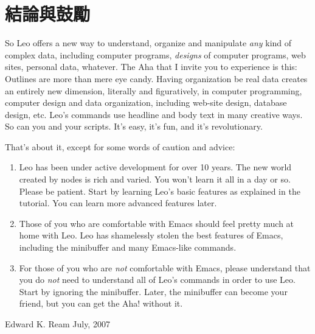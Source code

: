 \documentclass[a4paper,10pt,english]{sphinxmanual}
\begin{document}
\section{結論與鼓勵}
\label{preface:id5}
So Leo offers a new way to understand, organize and manipulate \emph{any} kind of
complex data, including computer programs, \emph{designs} of computer programs, web
sites, personal data, whatever. The Aha that I invite you to experience is this:
Outlines are more than mere eye candy. Having organization be real data creates
an entirely new dimension, literally and figuratively, in computer programming,
computer design and data organization, including web-site design, database
design, etc. Leo's commands use headline and body text in many creative ways. So
can you and your scripts. It's easy, it's fun, and it's revolutionary.

That's about it, except for some words of caution and advice:
\begin{enumerate}
\item {} 
Leo has been under active development for over 10 years. The new world
created by nodes is rich and varied. You won't learn it all in a day or so.
Please be patient. Start by learning Leo's basic features as explained in the
tutorial. You can learn more advanced features later.

\item {} 
Those of you who are comfortable with Emacs should feel pretty much at home
with Leo. Leo has shamelessly stolen the best features of Emacs, including
the minibuffer and many Emacs-like commands.

\item {} 
For those of you who are \emph{not} comfortable with Emacs, please understand that
you do \emph{not} need to understand all of Leo's commands in order to use Leo.
Start by ignoring the minibuffer. Later, the minibuffer can become your
friend, but you can get the Aha! without it.

\end{enumerate}

Edward K. Ream
July, 2007
\end{document}
